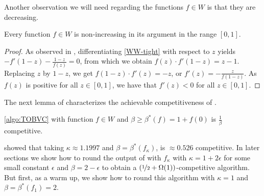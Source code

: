 Another observation we will need regarding the functions $f\in W$ is that they are decreasing.
\begin{obs}\label{f-non-increasing}
	Every function $f\in W$ is non-increasing in its argument in the range $[0,1]$.
\end{obs}
\begin{proof}
	As observed in \cite{wang2015two}, differentiating \eqref{WW-tight} with respect to $z$ yields $- f'(1-z) - \frac{1-z}{f(z)} = 0$, from which we obtain $f(z)\cdot f'(1-z) = z-1$. Replacing $z$ by $1-z$, we get $f(1-z)\cdot f'(z) = -z$, or $f'(z) = -\frac{z}{f(1-z)}$. As $f(z)$ is positive for all $z\in [0,1]$, we have that $f'(z)<0$ for all $z\in [0,1]$.
\end{proof}

The next lemma of \cite{wang2015two} characterizes the achievable competitiveness of .

\begin{lem}\label{ww-approx}
\cref{algo:TOBVC} with function $f \in W$ and $\beta \geq \beta^{*}(f) = 1+f(0)$ is $\frac{1}{\beta}$ competitive.
\end{lem}
\citet{wang2015two} showed that taking $\kappa \approx 1.1997$ and $\beta = \beta^*(f_\kappa)$,  is $\approx 0.526$ competitive. In later sections we show how to round the output of  with $f_\kappa$ with $\kappa=1+ 2 \epsilon$ for some small constant $\epsilon$ and $\beta=2-\epsilon$ to obtain a $(\nicefrac{1}{2}+\Omega(1))$-competitive algorithm. But first, as a warm up, we show how to round this algorithm with $\kappa=1$ and $\beta=\beta^*(f_1)=2$.


